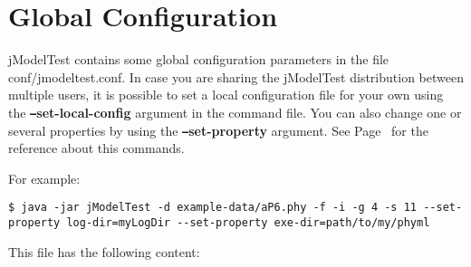 \section{Global Configuration}
\label{sec:config}

jModelTest contains some global configuration parameters in the file conf/jmodeltest.conf. In case you are sharing the jModelTest distribution between multiple users, it is possible to set a local configuration file for your own using the {\bf \texttt{--}set-local-config} argument in the command file. You can also change one or several properties by using the {\bf \texttt{--}set-property} argument. See Page~\pageref{pp:args-config} for the reference about this commands.

For example:
\begin{lstlisting}
$ java -jar jModelTest -d example-data/aP6.phy -f -i -g 4 -s 11 --set-property log-dir=myLogDir --set-property exe-dir=path/to/my/phyml
\end{lstlisting}

This file has the following content:

